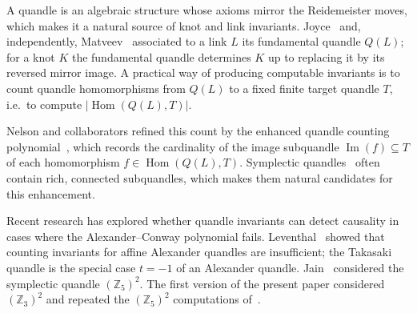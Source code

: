 \documentclass[11pt]{article}
\theoremstyle{definition}
\newcommand{\Z}{\mathbb{Z}}
\newcommand{\Hom}{\operatorname{Hom}}
\renewcommand{\Im}{\operatorname{Im}}
\begin{document}
A quandle is an algebraic structure whose axioms mirror the Reidemeister moves, which makes it a
natural source of knot and link invariants. Joyce~\cite{Joy82} and, independently,
Matveev~\cite{Mat82} associated to a link $L$ its fundamental quandle $Q(L)$; for a knot $K$ the
fundamental quandle determines $K$ up to replacing it by its reversed mirror image. A practical way of
producing computable invariants is to count quandle homomorphisms from $Q(L)$ to a fixed finite
target quandle $T$, i.e.\ to compute $|\Hom(Q(L),T)|$.

Nelson and collaborators refined this count by the enhanced quandle counting polynomial~\cite{Nel08,NN08},
which records the cardinality of the image subquandle $\Im(f)\subseteq T$ of each homomorphism
$f\in\Hom(Q(L),T)$. Symplectic quandles~\cite{NN08,Yet03} often contain rich, connected
subquandles, which makes them natural candidates for this enhancement.

Recent research has explored whether quandle invariants can detect causality in cases where the
Alexander--Conway polynomial fails. Leventhal~\cite{Lev22} showed that counting invariants for affine
Alexander quandles are insufficient; the Takasaki quandle is the special case $t=-1$ of an Alexander
quandle. Jain~\cite{Jai24} considered the symplectic quandle $(\Z_5)^2$. The first version of the
present paper considered $(\Z_3)^2$ and repeated the $(\Z_5)^2$ computations of~\cite{Jai24}.
\end{document}
